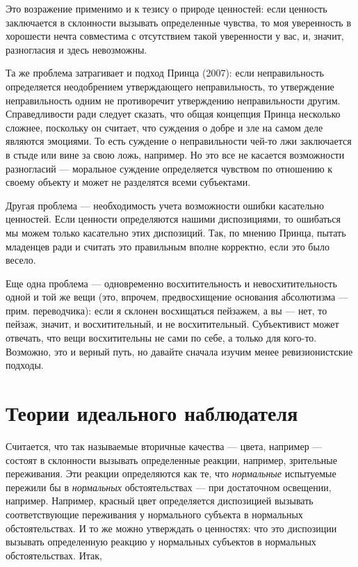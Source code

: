 \documentclass[11pt]{book}
\begin{document}
Это возражение применимо и к тезису о природе ценностей: если ценность заключается в склонности вызывать определенные чувства, то моя уверенность в хорошести нечта совместима с отсутствием такой уверенности у вас, и, значит, разногласия и здесь невозможны.

Та же проблема затрагивает и подход Принца (2007): если неправильность определяется неодобрением утверждающего неправильность, то утверждение неправильность одним не противоречит утверждению неправильности другим. Справедливости ради следует сказать, что общая концепция Принца несколько сложнее, поскольку он считает, что суждения о добре и зле на самом деле являются эмоциями. То есть суждение о неправильности чей-то лжи заключается в стыде или вине за свою ложь, например. Но это все не касается возможности разногласий --- моральное суждение определяется чувством по отношению к своему объекту и может не разделятся всеми субъектами.

Другая проблема --- необходимость учета возможности ошибки касательно ценностей. Если ценности определяются нашими диспозициями, то ошибаться мы можем только касательно этих диспозиций. Так, по мнению Принца, пытать младенцев ради и считать это правильным вполне корректно, если это было весело.

Еще одна проблема --- одновременно восхитительность и невосхитительность одной и той же вещи (это, впрочем, предвосхищение основания абсолютизма --- прим. переводчика): если я склонен восхищаться пейзажем, а вы --- нет, то пейзаж, значит, и восхитительный, и не восхитительный. Субъективист может отвечать, что вещи восхитительны не сами по себе, а только для кого-то. Возможно, это и верный путь, но давайте сначала изучим менее ревизионистские подходы.

\section{Теории идеального наблюдателя}

Считается, что так называемые вторичные качества --- цвета, например --- состоят в склонности вызывать определенные реакции, например, зрительные переживания. Эти реакции определяются как те, что \textit{нормальные} испытуемые пережили бы в \textit{нормальных} обстоятельствах --- при достаточном освещении, например. Например, красный цвет определяется диспозицией вызывать соответствующие переживания у нормального субъекта в нормальных обстоятельствах. И то же можно утверждать о ценностях: что это диспозиции вызывать определенную реакцию у нормальных субъектов в нормальных обстоятельствах. Итак,
\end{document}
